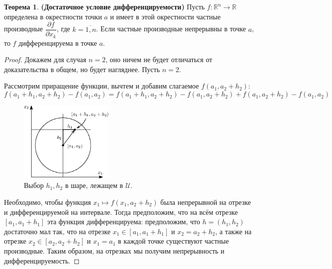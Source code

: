\documentclass[12pt]{article}
\newcommand{\MR}{\mathbb{R}}
\newcommand{\MU}{\mathcal{U}}
\theoremstyle{definition}
\newtheorem{theorem}{Теорема}
\begin{document}
\begin{theorem} \textbf{(Достаточное условие дифференцируемости)}
	Пусть $f \colon \MR^n \to \MR$ определена в окрестности точки $a$ и имеет в этой окрестности частные производные $\dfrac{\partial f}{\partial x_k}$, где $k = \overline{1,n}$. Если частные производные непрерывны в точке $a$, то $f$ дифференцируема в точке $a$.
\end{theorem}
\begin{proof}
	Докажем для случая $n=2$, оно ничем не будет отличаться от доказательства в общем, но будет нагляднее. Пусть $n = 2$.
	
	Рассмотрим приращение функции, вычтем и добавим слагаемое $f(a_1, a_2 + h_2)$:
	$$
		f(a_1 + h_1, a_2 + h_2) - f(a_1,a_2) = f(a_1 + h_1, a_2 + h_2) - f(a_1, a_2 + h_2) + f(a_1, a_2 + h_2) - f(a_1,a_2)
	$$	
	\begin{figure}[H]
		\centering
		\includegraphics[width=0.4\textwidth]{13_2.eps}
		\caption{Выбор $h_1, h_2$ в шаре, лежащем в $\MU$.}
		\label{13_2}
	\end{figure}
	Необходимо, чтобы функция $x_1 \mapsto f(x_1,a_2 + h_2)$ была непрерывной на отрезке и дифференцируемой на интервале. Тогда предположим, что на всём отрезке $[a_1, a_1+ h_1]$ эта функция дифференцируема: предположим, что $h = (h_1, h_2)$ достаточно мал так, что на отрезке $x_1 \in [a_1,a_1 + h_1]$ и $x_2 = a_2 + h_2$, а также на отрезке $x_2 \in [a_2, a_2 + h_2]$ и $x_1 = a_1$ в каждой точке существуют частные производные. Таким образом, на отрезках мы получим непрерывность и дифференцируемость.


\end{proof}
\end{document}
